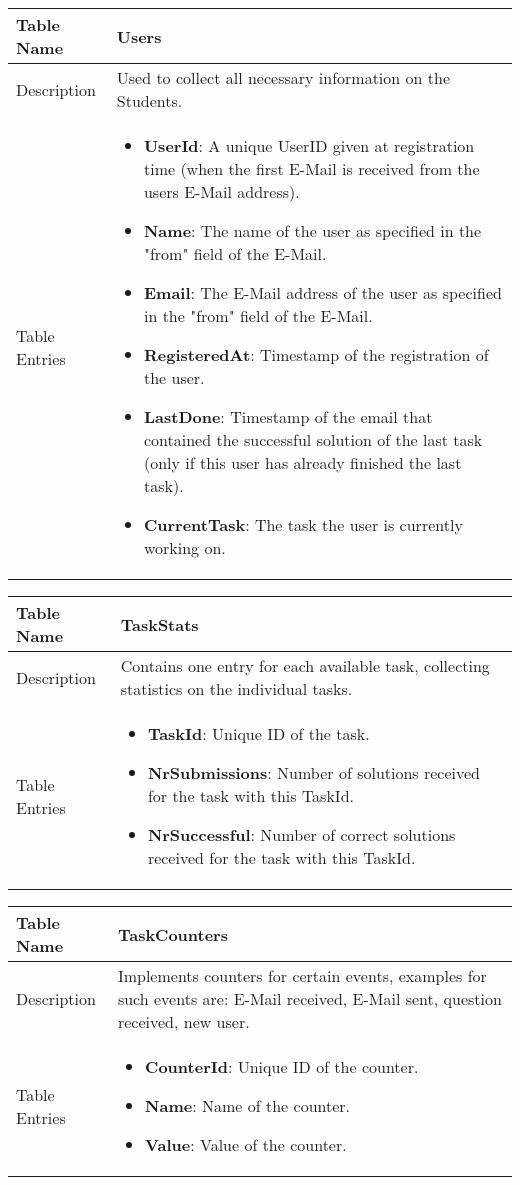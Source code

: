 \begin{tabular}{|p{3cm}|p{10cm}|}
\hline
Table Name & Users \\
\hline
Description & Used to collect all necessary information on the Students.\\
\hline
Table Entries & \begin{itemize}
        \item {\bf UserId}: A unique UserID given at registration time (when the first E-Mail
            is received from the users E-Mail address).
        \item {\bf Name}: The name of the user as specified in the "from" field of the E-Mail.
        \item {\bf Email}: The E-Mail address of the user as specified in the "from" field of the
            E-Mail.
        \item {\bf RegisteredAt}: Timestamp of the registration of the user.
        \item {\bf LastDone}: Timestamp of the email that contained the successful solution of the
            last task (only if this user has already finished the last task).
        \item {\bf CurrentTask}: The task the user is currently working on.
        \end{itemize} \\
\hline
\end{tabular}

\begin{tabular}{|p{3cm}|p{10cm}|}
\hline
Table Name & TaskStats \\
\hline
Description & Contains one entry for each available task, collecting statistics on the individual tasks.\\
\hline
Table Entries & \begin{itemize}
        \item {\bf TaskId}: Unique ID of the task.
        \item {\bf NrSubmissions}: Number of solutions received for the task with this TaskId.
        \item {\bf NrSuccessful}: Number of correct solutions received for the task with this TaskId.
        \end{itemize} \\
\hline
\end{tabular}

\begin{tabular}{|p{3cm}|p{10cm}|}
\hline
Table Name & TaskCounters \\
\hline
Description & Implements counters for certain events, examples for such events are: E-Mail received, E-Mail sent,
question received, new user.\\
\hline
Table Entries & \begin{itemize}
        \item {\bf CounterId}: Unique ID of the counter.
        \item {\bf Name}: Name of the counter.
        \item {\bf Value}: Value of the counter.
        \end{itemize} \\
\hline
\end{tabular}

